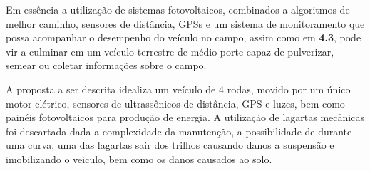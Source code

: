 Em essência a utilização de sistemas fotovoltaicos, combinados a algoritmos de melhor caminho, sensores de distância, GPSs e um sistema de monitoramento que possa acompanhar o desempenho do veículo no campo, assim como em \textbf{4.3}, pode vir a culminar em um veículo terrestre de médio porte capaz de pulverizar, semear ou coletar informações sobre o campo.

A proposta a ser descrita idealiza um veículo de 4 rodas, movido por um único motor elétrico, sensores de ultrassônicos de distância, GPS e luzes, bem como painéis fotovoltaicos para produção de energia. A utilização de lagartas mecânicas foi descartada dada a complexidade da manutenção, a possibilidade de durante uma curva, uma das lagartas sair dos trilhos causando danos a suspensão e imobilizando o veiculo, bem como os danos causados ao solo. 

